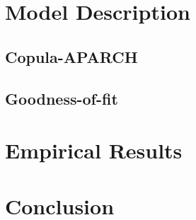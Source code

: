 \section{Model Description}
\label{CH:Model}

\subsection{Copula-APARCH}

\subsection{Goodness-of-fit}


\section{Empirical Results}
\label{CH:Empricial}


\section{Conclusion}
\label{CH:Conclusion}





